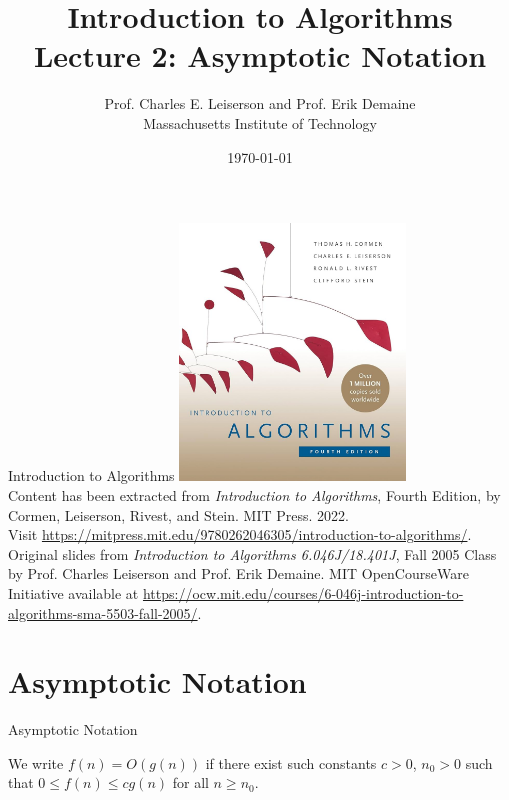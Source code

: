 \documentclass{beamer}
\title[Lecture 2]{Introduction to Algorithms \\ Lecture 2: Asymptotic Notation}
\author{Prof. Charles E. Leiserson and Prof. Erik Demaine \\ Massachusetts Institute of Technology}
\date{\today}
\begin{document}
\frame{\titlepage}

\begin{frame}{Introduction to Algorithms}
    \centering
    \includegraphics[width=0.45\textwidth]{figures/book_cover.jpg} \\
    \vspace{5mm}
    {
        \tiny
        Content has been extracted from \textit{Introduction to Algorithms}, Fourth Edition, by Cormen, Leiserson, Rivest, and Stein. MIT Press. 2022.\\
        Visit \url{https://mitpress.mit.edu/9780262046305/introduction-to-algorithms/}.\\
        Original slides from \textit{Introduction to Algorithms 6.046J/18.401J}, Fall 2005 Class by Prof. Charles Leiserson and Prof. Erik Demaine. MIT OpenCourseWare Initiative available at \url{https://ocw.mit.edu/courses/6-046j-introduction-to-algorithms-sma-5503-fall-2005/}.\\
    }
\end{frame}

\section{Asymptotic Notation}

\begin{frame}{Asymptotic Notation}
    \begin{tcolorbox}
        We write $f(n) = O(g(n))$ if there exist such constants $c > 0$, $n_0 > 0$ such that $0 \leq f(n) \leq cg(n)$ for all $n \geq n_0$.
    \end{tcolorbox}
\end{frame}
\end{document}
